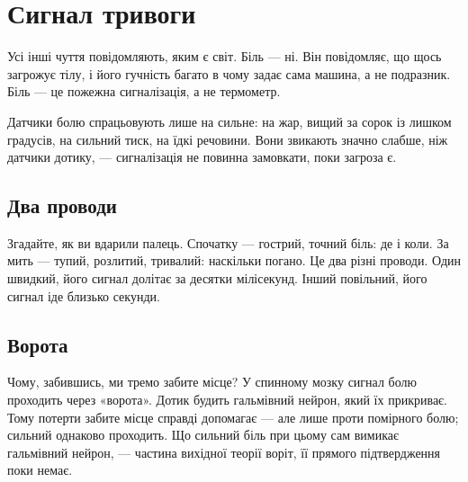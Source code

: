 \chapter{Сигнал тривоги}


Усі інші чуття повідомляють, яким є світ. Біль --- ні. Він повідомляє, що щось загрожує тілу, і його гучність багато в чому задає сама машина, а не подразник. Біль --- це пожежна сигналізація, а не термометр.

Датчики болю спрацьовують лише на сильне: на жар, вищий за сорок із лишком градусів, на сильний тиск, на їдкі речовини. Вони звикають значно слабше, ніж датчики дотику, --- сигналізація не повинна замовкати, поки загроза є.

\section*{Два проводи}

Згадайте, як ви вдарили палець. Спочатку --- гострий, точний біль: де і коли. За мить --- тупий, розлитий, тривалий: наскільки погано. Це два різні проводи. Один швидкий, його сигнал долітає за десятки мілісекунд. Інший повільний, його сигнал іде близько секунди.

\section*{Ворота}

Чому, забившись, ми тремо забите місце? У спинному мозку сигнал болю проходить через «ворота». Дотик будить гальмівний нейрон, який їх прикриває. Тому потерти забите місце справді допомагає --- але лише проти помірного болю; сильний однаково проходить. Що сильний біль при цьому сам вимикає гальмівний нейрон, --- частина вихідної теорії воріт, її прямого підтвердження поки немає.


